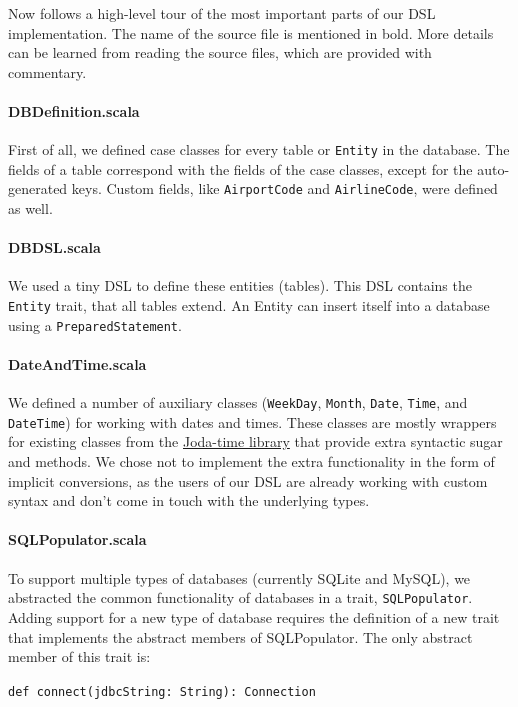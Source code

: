 \documentclass[a4paper]{article}
\newcommand{\cc}[1]{\texttt{#1}}
\renewcommand{\sc}[1]{\lstinline{#1}}
\begin{document}
Now follows a high-level tour of the most important parts of our DSL implementation.
The name of the source file is mentioned in bold.
More details can be learned from reading the source files, which are provided with commentary.

\paragraph{DBDefinition.scala}
First of all, we defined case classes for every table or \cc{Entity} in the database.
The fields of a table correspond with the fields of the case classes, except for the auto-generated keys.
Custom fields, like \cc{Airport\-Code} and \cc{Air\-line\-Code}, were defined as well.

\paragraph{DBDSL.scala}
We used a tiny DSL to define these entities (tables).
This DSL contains the \cc{Entity} trait, that all tables extend.
An Entity can insert itself into a database using a \cc{PreparedStatement}.

\paragraph{DateAndTime.scala}
We defined a number of auxiliary classes (\cc{WeekDay}, \cc{Month}, \cc{Date}, \cc{Time}, and \cc{DateTime}) for working with dates and times.
These classes are mostly wrappers for existing classes from the \href{http://joda-time.sourceforge.net/}{Joda-time library} that provide extra syntactic sugar and methods.
We chose not to implement the extra functionality in the form of implicit conversions, as the users of our DSL are already working with custom syntax and don't come in touch with the underlying types.

\paragraph{SQLPopulator.scala}
To support multiple types of databases (currently SQLite and MySQL), we abstracted the common functionality of databases in a trait, \cc{SQL\-Populator}.
Adding support for a new type of database requires the definition of a new trait that implements the abstract members of SQLPopulator.
The only abstract member of this trait is:

\sc{def connect(jdbcString: String): Connection}
\end{document}
